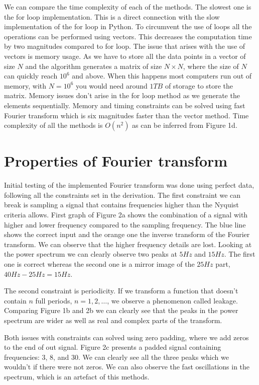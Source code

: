 \documentclass[12pt, a4paper]{article}
\begin{document}
We can compare the time complexity of each of the methods. The slowest one is the for loop implementation. This is a direct connection with the slow implementation of the for loop in Python. To circumvent the use of loops all the operations can be performed using vectors. This decreases the computation time by two magnitudes compared to for loop. The issue that arises with the use of vectors is memory usage. As we have to store all the data points in a vector of size $N$ and the algorithm generates a matrix of size $N \times N$, where the size of $N$ can quickly reach $10^6$ and above. When this happens most computers run out of memory, with $N=10^6$ you would need around $1 TB$ of storage to store the matrix. Memory issues don't arise in the for loop method as we generate the elements sequentially. Memory and timing constraints can be solved using fast Fourier transform which is six magnitudes faster than the vector method. Time complexity of all the methods is $O(n^2)$ as can be inferred from Figure 1d.

\section{Properties of Fourier transform}

Initial testing of the implemented Fourier transform was done using perfect data, following all the constraints set in the derivation. The first constraint we can break is sampling a signal that contains frequencies higher than the Nyquist criteria allows. First graph of Figure 2a shows the combination of a signal with higher and lower frequency compared to the sampling frequency. The blue line shows the correct input and the orange one the inverse transform of the Fourier transform. We can observe that the higher frequency details are lost. Looking at the power spectrum we can clearly observe two peaks at $5 Hz$ and $15 Hz$. The first one is correct whereas the second one is a mirror image of the $25 Hz$ part, $40 Hz - 25 Hz = 15 Hz$.

The second constraint is periodicity. If we transform a function that doesn't contain $n$ full periods, $n = 1, 2, \dots$, we observe a phenomenon called leakage. Comparing Figure 1b and 2b we can clearly see that the peaks in the power spectrum are wider as well as real and complex parts of the transform.

Both issues with constraints can solved using zero padding, where we add zeros to the end of out signal. Figure 2c presents a padded signal containing frequencies: 3, 8, and 30. We can clearly see all the three peaks which we wouldn't if there were not zeros. We can also observe the fast oscillations in the spectrum, which is an artefact of this methods.
\end{document}
